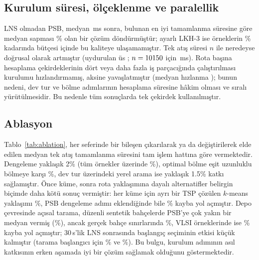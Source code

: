 \subsection{Kurulum süresi, ölçeklenme ve paralellik}
LNS olmadan PSB, medyan \PsbOneShotMs\,ms sonra, bulunan en iyi tamamlanma süresine göre
medyan sapması \PsbOneShotGap\% olan bir çözüm döndürmüştür; ayarlı LKH-3 ise örneklerin
\ReachNeverAll\% kadarında bütçesi içinde bu kaliteye ulaşamamıştır. Tek atış
süresi $n$ ile neredeyse doğrusal olarak artmıştır (uydurulan üs \ScaleExponent;
$n=10150$ için \ScaleMsLargest\,ms). Rota başına hesaplama çekirdeklerinin dört
veya daha fazla iş parçacığında çalıştırılması kurulumu hızlandırmamış, aksine yavaşlatmıştır
(medyan hızlanma \ScaleSpeedupFour); bunun nedeni, dev tur ve bölme adımlarının hesaplama süresine
hâkim olması ve sıralı yürütülmesidir. Bu nedenle tüm sonuçlarda tek çekirdek kullanılmıştır.

\subsection{Ablasyon}
Tablo~\ref{tab:ablation}, her seferinde bir bileşen çıkarılarak ya da değiştirilerek elde
edilen medyan tek atış tamamlanma süresini tam işlem hattına göre vermektedir. Dengeleme
yaklaşık 2\% (tüm örnekler üzerinde \AblNoBalanceAll\%), optimal bölme eşit uzunluklu
bölmeye karşı \AblEqualSplitAll\%, dev tur üzerindeki yerel arama ise yaklaşık 1.5\%
katkı sağlamıştır. Önce küme, sonra rota yaklaşımına dayalı alternatifler belirgin biçimde daha kötü sonuç vermiştir:
her küme için ayrı bir TSP çözülen $k$-means yaklaşımı \AblKmeansTspAll\%, PSB dengeleme adımı eklendiğinde
bile \AblKmeansBalAll\% kayba yol açmıştır. Depo çevresinde açısal tarama, düzenli
sentetik bahçelerde PSB'ye çok yakın bir medyan vermiş (\AblSweepTspOrchard\%), ancak gerçek
bahçe sınırlarında \AblSweepTspOsm\%, VLSI örneklerinde ise \AblSweepTspVlsi\% kayba yol açmıştır;
30\,s'lik LNS sonrasında başlangıç seçiminin etkisi küçük kalmıştır (tarama
başlangıcı için \LnsStartOrchard\% ve \LnsStartVlsi\%). Bu bulgu, kurulum adımının asıl katkısının
erken aşamada iyi bir çözüm sağlamak olduğunu göstermektedir.

\begin{table}[t]
\centering
\caption{Tek atış kurulum adımının ablasyonu: tam PSB işlem hattına göre medyan tamamlanma süresi
(\%) ve medyan süre; sent.: sentetik bahçeler, gerçek: gerçek
bahçe sınırları, lit.: literatür kümesi (örnek sayıları parantez içinde)}\label{tab:ablation}
\scriptsize
\setlength{\tabcolsep}{2.5pt}

\end{table}

